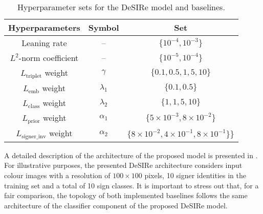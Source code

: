 \begin{table}[t]
    \centering
        \begin{tabular}{c|c|c}
            Hyperparameters                    & Symbol & Set                \\\hline
            Leaning rate                                & --       & $\{10^{-4}, 10^{-3}\}$            \\
            $L^2$-norm coefficient                              & --      & $\{10^{-5}, 10^{-4}\}$             \\
            $L_{\text{triplet}}$ weight                 & $\gamma$                & $\{0.1, 0.5, 1, 5, 10\}$                  \\
            $L_{\text{emb}}$ weight                 & $\lambda_{1}$                & $\{0.1, 0.5\}$                  \\
            $L_{\text{class}}$ weight                 & $\lambda_{2}$                & $\{1, 1,5,10\}$                  \\
            $L_{\text{prior}}$ weight                 & $\alpha_{1}$                & $\{5 \times 10^{-3}, 8 \times 10^{-2}\}$                  \\
            $L_{\text{signer\_inv}}$ weight                 & $\alpha_{2}$                & $\{8 \times 10^{-2}, 4 \times 10^{-1}, 8 \times 10^{-1}\}$\}                  \\
        \end{tabular}
    \caption{Hyperparameter sets for the DeSIRe model and baselines.}
    \label{tab:desire_hyperparam}
\end{table}


A detailed description of the architecture of the proposed model is presented in . For illustrative purposes, the presented DeSIRe architecture considers input colour images with a resolution of $100\times 100$ pixels, 10 signer identities in the training set and a total of 10 sign classes. It is important to stress out that, for a fair comparison, the topology of both implemented baselines follows the same architecture of the classifier component of the proposed DeSIRe model.

